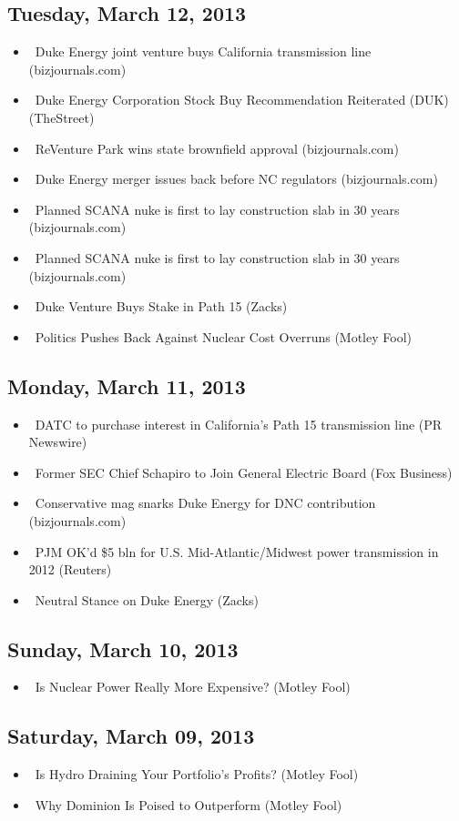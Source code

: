 \documentclass[11pt,asymmetric]{article}
\begin{document}
\subsection*{Tuesday, March 12, 2013}
\begin{itemize}
\item\ Duke Energy joint venture buys California transmission line (bizjournals.com)
\item\ Duke Energy Corporation Stock Buy Recommendation Reiterated (DUK) (TheStreet)
\item\ ReVenture Park wins state brownfield approval (bizjournals.com)
\item\ Duke Energy merger issues back before NC regulators (bizjournals.com)
\item\ Planned SCANA nuke is first to lay construction slab in 30 years (bizjournals.com)
\item\ Planned SCANA nuke is first to lay construction slab in 30 years (bizjournals.com)
\item\ Duke Venture Buys Stake in Path 15 (Zacks)
\item\ Politics Pushes Back Against Nuclear Cost Overruns (Motley Fool)
\end{itemize}
\subsection*{Monday, March 11, 2013}
\begin{itemize}
\item\ DATC to purchase interest in California's Path 15 transmission line (PR Newswire)
\item\ Former SEC Chief Schapiro to Join General Electric Board (Fox Business)
\item\ Conservative mag snarks Duke Energy for DNC contribution (bizjournals.com)
\item\ PJM OK'd \$5 bln for U.S. Mid-Atlantic/Midwest power transmission in 2012 (Reuters)
\item\ Neutral Stance on Duke Energy (Zacks)
\end{itemize}
\subsection*{Sunday, March 10, 2013}
\begin{itemize}
\item\ Is Nuclear Power Really More Expensive? (Motley Fool)
\end{itemize}
\subsection*{Saturday, March 09, 2013}
\begin{itemize}
\item\ Is Hydro Draining Your Portfolio's Profits? (Motley Fool)
\item\ Why Dominion Is Poised to Outperform (Motley Fool)
\end{itemize}
\end{document}
